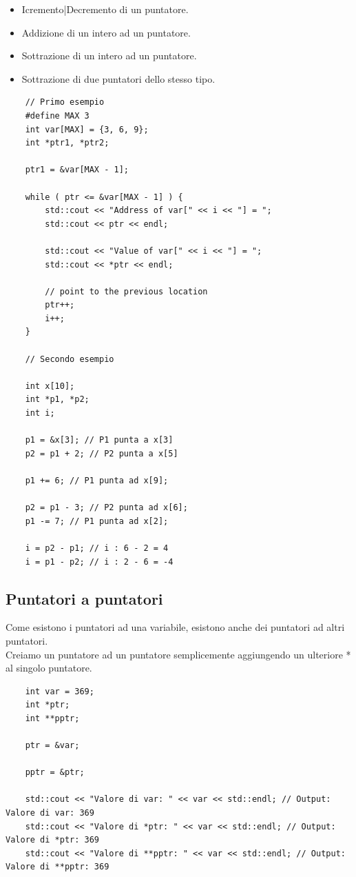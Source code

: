 \begin{itemize}
	\item \textsf{\small Icremento|Decremento di un puntatore.}
	\item \textsf{\small Addizione di un intero ad un puntatore.}
	\item \textsf{\small Sottrazione di un intero ad un puntatore.}
	\item \textsf{\small Sottrazione di due puntatori dello stesso tipo.}
\end{itemize}

\begin{lstlisting}
	// Primo esempio
	#define MAX 3
	int var[MAX] = {3, 6, 9};
	int *ptr1, *ptr2;
	
	ptr1 = &var[MAX - 1];
	
	while ( ptr <= &var[MAX - 1] ) {
		std::cout << "Address of var[" << i << "] = ";
		std::cout << ptr << endl;
		
		std::cout << "Value of var[" << i << "] = ";
		std::cout << *ptr << endl;
		
		// point to the previous location
		ptr++;
		i++;
	}
	
	// Secondo esempio
	
	int x[10];
	int *p1, *p2;
	int i;
	
	p1 = &x[3]; // P1 punta a x[3]
	p2 = p1 + 2; // P2 punta a x[5]
	
	p1 += 6; // P1 punta ad x[9];
	
	p2 = p1 - 3; // P2 punta ad x[6];
	p1 -= 7; // P1 punta ad x[2];
	
	i = p2 - p1; // i : 6 - 2 = 4
	i = p1 - p2; // i : 2 - 6 = -4
\end{lstlisting}

\subsection{Puntatori a puntatori}

\textsf{\small Come esistono i puntatori ad una variabile, esistono anche dei puntatori ad altri puntatori.} \\

\textsf{\small Creiamo un puntatore ad un puntatore semplicemente aggiungendo un ulteriore * al singolo puntatore.}

\begin{lstlisting}
	int var = 369;
	int *ptr;
	int **pptr;
	
	ptr = &var;
	
	pptr = &ptr;
	
	std::cout << "Valore di var: " << var << std::endl; // Output: Valore di var: 369
	std::cout << "Valore di *ptr: " << var << std::endl; // Output: Valore di *ptr: 369
	std::cout << "Valore di **pptr: " << var << std::endl; // Output: Valore di **pptr: 369
\end{lstlisting}

